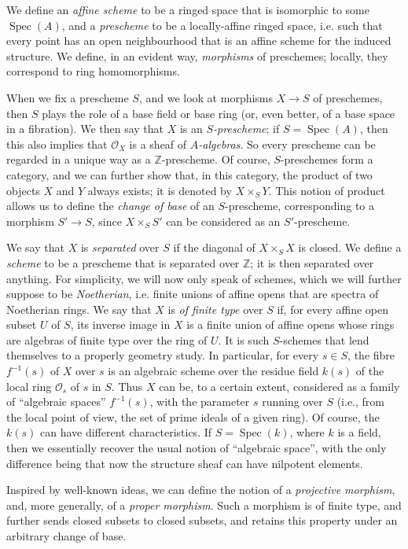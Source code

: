 \documentclass{article}
\newcommand{\scr}[1]{{\mathscr{#1}}}
\DeclareMathOperator{\Spec}{Spec}
\newcommand{\oldpage}[1]{\marginpar{\footnotesize$\Big\vert$ \textit{p.~#1}}}
\begin{document}
We define an \emph{affine scheme} to be a ringed space that is isomorphic to some $\Spec(A)$, and a \emph{prescheme} to be a locally-affine ringed space, i.e. such that every point has an open neighbourhood that is an affine scheme for the induced structure.
We define, in an evident way, \emph{morphisms} of preschemes;
locally, they correspond to ring homomorphisms.

When we fix a prescheme $S$, and we look at morphisms $X\to S$ of preschemes, then $S$ plays the role of a base field or base ring (or, even better, of a base space in a fibration).
We then say that $X$ is an \emph{$S$-prescheme};
if $S=\Spec(A)$, then this also implies that $\scr{O}_X$ is a sheaf of \emph{$A$-algebras}.
So every prescheme can be regarded in a unique way as a $\mathbb{Z}$-prescheme.
Of course, $S$-preschemes form a category, and we can further show that, in this category, the product of two objects $X$ and $Y$ always exists;
it is denoted by $X\times_S Y$.
This notion of product allows us to define the \emph{change of base} of an $S$-prescheme, corresponding to a morphism $S'\to S$, since $X\times_S S'$ can be considered as an $S'$-prescheme.

We say that $X$ is \emph{separated} over $S$ if the diagonal of $X\times_S X$ is closed.
We define a \emph{scheme} to be a prescheme that is separated over $\mathbb{Z}$;
it is then separated over anything.
For simplicity, we will now only speak of schemes, which we will further suppose to be \emph{Noetherian}, i.e. finite unions of affine opens that are spectra of Noetherian rings.
We say that $X$ is \emph{of finite type} over $S$ if, for every affine open subset $U$ of $S$, its inverse image in $X$ is a finite union of affine opens whose rings are algebras of finite type over the ring of $U$.
It is such $S$-schemes that lend themselves to a properly geometry study.
In particular, for every $s\in S$, the fibre $f^{-1}(s)$ of $X$ over $s$ is an algebraic scheme over the residue field $k(s)$ of the local ring $\scr{O}_s$ of $s$ in $S$.
Thus $X$ can be, to a certain extent, considered as a family of ``algebraic spaces'' $f^{-1}(s)$, with the parameter $s$ running over $S$ (i.e., from the local point of view, the set of prime ideals of a given ring).
Of course, the $k(s)$ can have different characteristics.
If $S=\Spec(k)$, where $k$ is a field, then we essentially recover the usual notion of ``algebraic space'', with the only difference being that now the structure sheaf can have nilpotent elements.

\oldpage{182-03}
Inspired by well-known ideas, we can define the notion of a \emph{projective morphism}, and, more generally, of a \emph{proper morphism}.
Such a morphism is of finite type, and further sends closed subsets to closed subsets, and retains this property under an arbitrary change of base.
\end{document}

